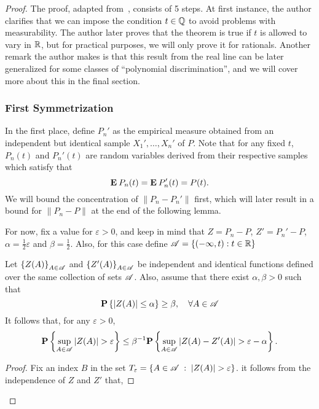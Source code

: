 \begin{proof}
  The proof, adapted from~\cite{pollard1984convergence}, consists of 5 steps. At first instance, the author clarifies that we can impose the condition $t\in \Q$ to avoid problems with measurability. The author later proves that the theorem is true if $t$ is allowed to vary in $\R$, but for practical purposes, we will only prove it for rationals. Another remark the author makes is that this result from the real line can be later generalized for some classes of ``polynomial discrimination'', and we will cover more about this in the final section.

  \subsubsection*{First Symmetrization}
  In the first place, define $P_n'$ as the empirical measure obtained from an independent but identical sample $X_1',\ldots, X_n'$ of $P$. Note that for any fixed $t$, $P_n(t)$ and $P_n'(t)$ are random variables derived from their respective samples which satisfy that
  \[ \E P_n(t) = \E P_n'(t) = P(t). \] 
  We will bound the concentration of $\|P_n- P_n'\|$ first, which will later result in a bound for $\|P_n - P\|$ at the end of the following lemma.

  \vspace*{1em}

  For now, fix a value for $\varepsilon > 0$, and keep in mind that $Z = P_n - P$, $Z' = P_n' - P$, $\alpha = \frac{1}{2}\varepsilon$ and $\beta = \frac{1}{2}$. Also, for this case define $\AA = \{(-\infty, t) : t\in \R\}$

  \begin{lemma}\label{gc:l1}
    Let ${\{Z(A)\}}_{A\in \AA}$ and ${\{Z'(A)\}}_{A\in \AA}$ be independent and identical functions defined over the same collection of sets $\AA$. Also, assume that there exist $\alpha, \beta > 0$ such that
    \[ \P\left\{|Z(A)| \leq \alpha \right\} \geq \beta, \hspace*{1em} \forall A \in \AA \]
    It follows that, for any $\varepsilon > 0$,
    \[  \P\left\{\sup_{A\in \AA} |Z(A)| > \varepsilon \right\} \leq \beta^{-1} \P\left\{\sup_{A\in \AA} |Z(A)-Z'(A)| > \varepsilon - \alpha \right\}. \]     
  \end{lemma}

  \begin{proof}
    Fix an index $B$ in the set $T_\varepsilon = \{ A \in \AA \;:\; |Z(A)| > \varepsilon\}$.
    it follows from the independence of $Z$ and $Z'$ that,


\end{proof}
\end{proof}
